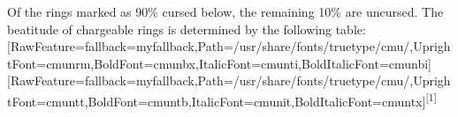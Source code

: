 Of the rings marked as 90\% cursed below, the remaining 10\% are uncursed. The beatitude\footnotemark[22] of chargeable rings is determined by the following table:\allowbreak{}\setmainfont{cmunrm.ttf}[RawFeature={fallback=myfallback},Path=/usr/share/fonts/truetype/cmu/,UprightFont=cmunrm,BoldFont=cmunbx,ItalicFont=cmunti,BoldItalicFont=cmunbi]\setmonofont{cmunrm.ttf}[RawFeature={fallback=myfallback},Path=/usr/share/fonts/truetype/cmu/,UprightFont=cmuntt,BoldFont=cmuntb,ItalicFont=cmunit,BoldItalicFont=cmuntx]\textsuperscript{{$\text{[}$}1{$\text{]}$}}




\begin{longtable}{|>{\RaggedRight}p{0.22438\linewidth}|>{\RaggedRight}p{0.16376\linewidth}|>{\RaggedRight}p{0.14149\linewidth}|>{\RaggedRight}p{0.16376\linewidth}|>{\RaggedRight}p{0.16376\linewidth}|} \hline 

\end{longtable}
